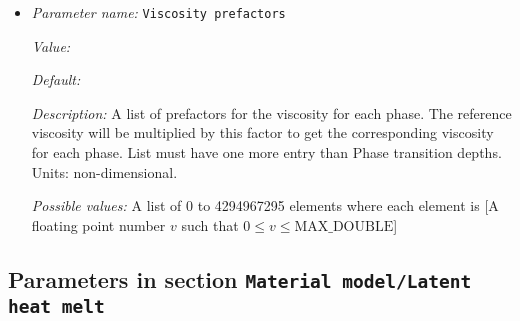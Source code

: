 \begin{itemize}
{\it Value:} 5e24


{\it Default:} 5e24


{\it Description:} The value of the constant viscosity. Units: $kg/m/s$.


{\it Possible values:} A floating point number $v$ such that $0 \leq v \leq \text{MAX\_DOUBLE}$
\item {\it Parameter name:} {\tt Viscosity prefactors}
\label{parameters:Material model/Latent heat/Viscosity prefactors}
\label{parameters:Material_20model/Latent_20heat/Viscosity_20prefactors}


{\it Value:} 


{\it Default:} 


{\it Description:} A list of prefactors for the viscosity for each phase. The reference viscosity will be multiplied by this factor to get the corresponding viscosity for each phase. List must have one more entry than Phase transition depths. Units: non-dimensional.


{\it Possible values:} A list of 0 to 4294967295 elements where each element is [A floating point number $v$ such that $0 \leq v \leq \text{MAX\_DOUBLE}$]
\end{itemize}

\subsection{Parameters in section \tt Material model/Latent heat melt}
\label{parameters:Material_20model/Latent_20heat_20melt}


